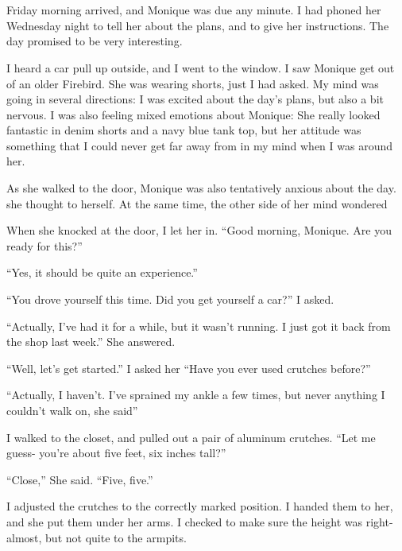 \chapter{~}
Friday morning arrived, and Monique was due any minute. I had phoned her Wednesday night to
tell her about the plans, and to give her instructions. The day promised to be very interesting.

I heard a car pull up outside, and I went to the window. I saw Monique get out of an older
Firebird. She was wearing shorts, just I had asked. My mind was going in several directions: I
was excited about the day's plans, but also a bit nervous. I was also feeling mixed emotions
about Monique: She really looked fantastic in denim shorts and a navy blue tank top, but her
attitude was something that I could never get far away from in my mind when I was around her.

As she walked to the door, Monique was also tentatively anxious about the day.  she thought to
herself. At the same time, the other side of her mind wondered 

When she knocked at the door, I let her in. ``Good morning, Monique. Are you ready for
this?''

``Yes, it should be quite an experience.''

``You drove yourself this time. Did you get yourself a car?'' I asked.

``Actually, I've had it for a while, but it wasn't running. I just got it back from the shop
last week.'' She answered.

``Well, let's get started.'' I asked her ``Have you ever used crutches before?''

``Actually, I haven't. I've sprained my ankle a few times, but never anything I couldn't
walk on, she said''

I walked to the closet, and pulled out a pair of aluminum crutches. ``Let me guess- you're
about five feet, six inches tall?''

``Close,'' She said. ``Five, five.''

I adjusted the crutches to the correctly marked position. I handed them to her, and she put
them under her arms. I checked to make sure the height was right- almost, but not quite to the
armpits.

